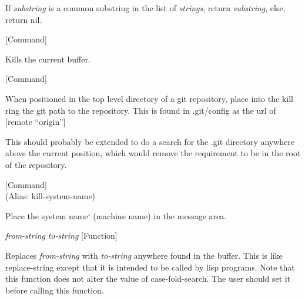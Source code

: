 \begin{doc-string}
If \emph{substring} is a common substring in the list of \emph{strings}, return \emph{substring},
else, return nil.
\end{doc-string}

\vspace{1em}
\noindent
{}
\usebox{\funcname}
 \hfill [Command]

\begin{doc-string}
Kills the current buffer.
\end{doc-string}

\vspace{1em}
\noindent
{}
\usebox{\funcname}
 \hfill [Command]

\begin{doc-string}
When positioned in the top level directory of a git repository, place into
the kill ring the git path to the repository.  This is found in .git/config as
the url of [remote ``origin'']

This should probably be extended to do a search for the .git directory anywhere
above the current position, which would remove the requirement to be in the root
of the repository.
\end{doc-string}

\vspace{1em}
\noindent
{}
\usebox{\funcname}
 \hfill [Command]\\%
 (Alias: kill-system-name)

\begin{doc-string}
Place the system name` (machine name) in the message area.
\end{doc-string}

\vspace{1em}
\noindent
{}
\usebox{\funcname}\emph{from-string} \emph{to-string}
 \hfill [Function]

\begin{doc-string}
Replaces \emph{from-string} with \emph{to-string} anywhere found in the buffer.
This is like replace-string except that it is intended to be called
by lisp programs.  Note that this function does not alter the value of
case-fold-search.  The user should set it before calling this function.
\end{doc-string}

